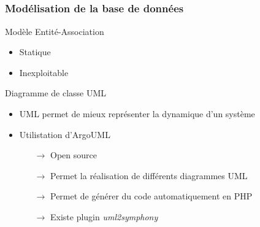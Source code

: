 \subsection{} 

\begin{frame}
\frametitle{Modélisation de la base de données}
		Modèle Entité-Association
		\begin{itemize}
			\item Statique
			\item Inexploitable \\
		\end{itemize}		 
		 Diagramme de classe UML
		\begin{itemize}
			\item UML permet de mieux représenter la dynamique d'un système
			\item Utilistation d'ArgoUML
			\begin{itemize}
				\item[$\rightarrow  $] Open source
				\item[$\rightarrow  $] Permet la réalisation de différents diagrammes UML
				\item[$\rightarrow  $] Permet de générer du code automatiquement en PHP
				\item[$\rightarrow  $] Existe plugin \textit{uml2symphony}
			\end{itemize}
		\end{itemize}
\end{frame}


